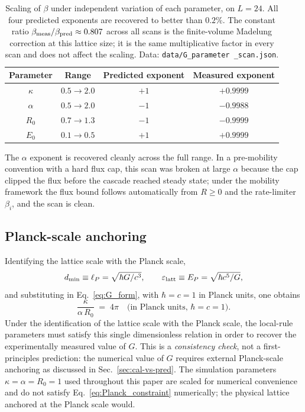 \documentclass[11pt,a4paper]{article}
\begin{document}
\begin{table}[h]
\centering
\begin{tabular}{cccc}
\toprule
Parameter & Range & Predicted exponent & Measured exponent\\
\midrule
$\kappa$  & $0.5 \to 2.0$  & $+1$ & $+0.9999$\\
$\alpha$  & $0.5 \to 2.0$  & $-1$ & $-0.9988$\\
$R_0$     & $0.7 \to 1.3$  & $-1$ & $-0.9999$\\
$E_0$     & $0.1 \to 0.5$  & $+1$ & $+0.9999$\\
\bottomrule
\end{tabular}
\caption{Scaling of $\beta$ under independent variation of
each parameter, on $L = 24$. All four predicted exponents are
recovered to better than $0.2\%$. The constant ratio
$\beta_{\rm meas}/\beta_{\rm pred} \approx 0.807$ across all
scans is the finite-volume Madelung correction at this lattice
size; it is the same multiplicative factor in every scan and
does not affect the scaling. Data: \texttt{data/G\_parameter
\_scan.json}.}
\label{tab:G_scaling}
\end{table}

The $\alpha$ exponent is recovered cleanly across the full
range. In a pre-mobility convention with a hard flux cap, this
scan was broken at large $\alpha$ because the cap clipped the
flux before the cascade reached steady state; under the
mobility framework the flux bound follows automatically from
$R \ge 0$ and the rate-limiter $\beta_i$, and the scan is
clean.

\subsection{Planck-scale anchoring}

Identifying the lattice scale with the Planck scale,
\[
d_{\min} \equiv \ell_P = \sqrt{\hbar G / c^3},
\qquad
\varepsilon_{\rm latt} \equiv E_P = \sqrt{\hbar c^5 / G},
\]
and substituting in Eq.~\eqref{eq:G_form}, with $\hbar = c = 1$
in Planck units, one obtains
\begin{equation}
\boxed{\;
\frac{\kappa}{\alpha\, R_0} \;=\; 4\pi
\quad
\text{(in Planck units, $\hbar = c = 1$).}
\;}
\label{eq:Planck_constraint}
\end{equation}
Under the identification of the lattice scale with the Planck
scale, the local-rule parameters must satisfy this single
dimensionless relation in order to recover the experimentally
measured value of $G$. This is a \emph{consistency check},
not a first-principles prediction: the numerical value of $G$
requires external Planck-scale anchoring as discussed in
Sec.~\ref{sec:cal-vs-pred}. The
simulation parameters $\kappa = \alpha = R_0 = 1$ used
throughout this paper are scaled for numerical convenience and
do not satisfy Eq.~\eqref{eq:Planck_constraint} numerically;
the physical lattice anchored at the Planck scale would.
\end{document}
